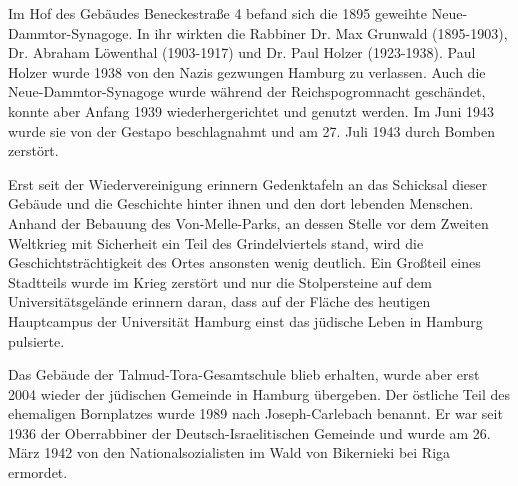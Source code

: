 \documentclass[10pt,a4paper,oneside,ngerman,numbers=noenddot]{scrartcl}
\begin{document}
Im Hof des Gebäudes Beneckestraße 4 befand sich die 1895 geweihte
Neue-Dammtor-Synagoge. In ihr wirkten die Rabbiner Dr. Max Grunwald (1895-1903),
Dr. Abraham Löwenthal (1903-1917) und Dr. Paul Holzer (1923-1938). Paul Holzer
wurde 1938 von den Nazis gezwungen Hamburg zu verlassen.
Auch die Neue-Dammtor-Synagoge wurde während der Reichspogromnacht geschändet,
konnte aber Anfang 1939 wiederhergerichtet und genutzt werden. Im Juni 1943 wurde
sie von der Gestapo beschlagnahmt und am 27. Juli 1943 durch Bomben zerstört.

Erst seit der Wiedervereinigung erinnern Gedenktafeln an das Schicksal dieser
Gebäude und die Geschichte hinter ihnen und den dort lebenden Menschen. Anhand
der Bebauung des Von-Melle-Parks, an dessen Stelle vor dem Zweiten Weltkrieg
mit Sicherheit ein Teil des Grindelviertels stand, wird die Geschichtsträchtigkeit
des Ortes ansonsten wenig deutlich. Ein Großteil eines Stadtteils wurde im Krieg
zerstört und nur die Stolpersteine auf dem Universitätsgelände erinnern daran, dass
auf der Fläche des heutigen Hauptcampus der Universität Hamburg einst das jüdische
Leben in Hamburg pulsierte.

Das Gebäude der Talmud-Tora-Gesamtschule blieb erhalten, wurde aber erst 2004
wieder der jüdischen Gemeinde in Hamburg übergeben. Der östliche Teil des ehemaligen
Bornplatzes wurde 1989 nach Joseph-Carlebach benannt. Er war seit 1936 der
Oberrabbiner der Deutsch-Israelitischen Gemeinde und wurde am 26. März 1942
von den Nationalsozialisten im Wald von Bikernieki bei Riga ermordet.
\end{document}
